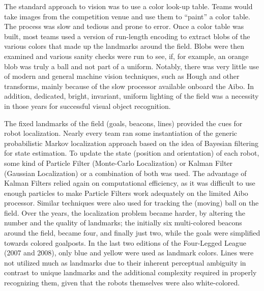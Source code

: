 \documentclass{llncs}
\begin{document}
The standard approach to vision was to use a color look-up table.
Teams would take images from the competition venue and use them to
``paint'' a color table. The process was slow and tedious and prone to error.
Once a color table was built, most teams used a version of run-length encoding
to extract blobs of the various colors that made up the landmarks around the field.
Blobs were then examined and various sanity checks were run to see, if,
for example, an orange blob was truly a ball and not part of a uniform.
Notably, there was very little use of modern and general machine vision techniques,
such as Hough and other transforms, mainly because of the slow processor
available onboard the Aibo. In addition, dedicated, bright, invariant, uniform lighting of the field was a necessity 
in those years for successful visual object recognition. 

The fixed landmarks of the field (goals, beacons, lines) provided the cues for robot localization. 
Nearly every team ran some instantiation of the generic probabilistic Markov localization approach based on the idea of Bayesian filtering for state estimation. 
To update the state (position and orientation) of each robot, some kind of Particle Filter (Monte-Carlo
Localization) or Kalman Filter (Gaussian Localization) or a combination of both was used. The advantage of Kalman Filters 
relied again on computational efficiency, as it was difficult to use enough
particles to make Particle Filters work adequately on the limited 
Aibo processor. 
Similar techniques were also used for tracking the (moving) ball on the field. 
Over the years, the localization problem became harder, by altering 
the number and the quality of landmarks; the initially six multi-colored beacons 
around the field, became four, and finally just two, while the goals were 
simplified towards colored goalposts. In the last two editions 
of the Four-Legged League (2007 and 2008), only blue and yellow were used as landmark colors. 
Lines were not utilized much as landmarks due to their inherent perceptual ambiguity 
in contrast to unique landmarks and the additional complexity required 
in properly recognizing them, given that the robots themselves were also white-colored. 
\end{document}
